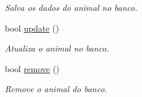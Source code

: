 \begin{DoxyCompactItemize}
\begin{DoxyCompactList}\small\item\em Salva os dados do animal no banco. \end{DoxyCompactList}\item 
bool \hyperlink{classAnimal_a2b9de87e4f753fc9f92aeb012bf098c5}{update} ()
\begin{DoxyCompactList}\small\item\em Atualiza o animal no banco. \end{DoxyCompactList}\item 
bool \hyperlink{classAnimal_a0aea60eaeb4d8f1d68d2c37e279d2d20}{remove} ()
\begin{DoxyCompactList}\small\item\em Remove o animal do banco. \end{DoxyCompactList}\end{DoxyCompactItemize}
